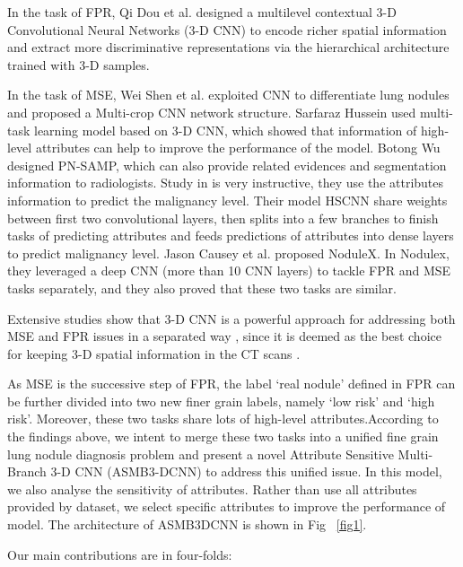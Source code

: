 \documentclass[runningheads]{llncs}
\begin{document}
In the task of FPR, Qi Dou et al. \cite{Qi2016Multilevel} designed a multilevel contextual 3-D Convolutional Neural Networks (3-D CNN) to encode richer spatial information and extract more discriminative representations via the hierarchical architecture trained with 3-D samples.

In the task of MSE, Wei Shen et al. \cite{Shen2017Multi} exploited CNN to differentiate lung nodules and proposed a Multi-crop CNN network structure. Sarfaraz Hussein \cite{Hussein2017Risk} used multi-task learning model based on 3-D CNN, which showed that information of high-level attributes can help to improve the performance of the model. Botong Wu\cite{Wu2018Joint} designed PN-SAMP, which can also provide related evidences and segmentation information to radiologists.
Study in \cite{shen2019interpretable} is very instructive, they  use the attributes information to predict the malignancy level. Their model HSCNN share weights between first two convolutional layers, then splits into a few branches to finish tasks of predicting attributes and  feeds predictions of attributes into  dense layers to predict malignancy level.
Jason Causey et al.\cite{Causey2018Highly} proposed NoduleX. In Nodulex, they leveraged a deep CNN (more than 10 CNN layers) to tackle FPR and MSE tasks separately, and they also proved that these two tasks are similar.

Extensive studies show that 3-D CNN is a powerful approach for addressing both MSE and FPR issues in a separated way \cite{Qi2016Multilevel}\cite{Causey2018Highly}\cite{Shen2015Multi}\cite{Kang20173D}, since it is deemed as the best choice for keeping 3-D spatial information in the CT scans \cite{Yorozu1987Electron}.


 As MSE is the successive step of FPR, the label `real nodule' defined in FPR can be further divided into two new finer grain labels, namely `low risk' and `high risk'. Moreover, these two tasks share lots of high-level attributes.According to the findings above, we intent to merge these two tasks into a unified fine grain lung nodule diagnosis problem and present a novel Attribute Sensitive Multi-Branch 3-D CNN (ASMB3-DCNN) to address this unified issue. In this model, we also analyse the sensitivity of attributes. Rather than use all attributes provided by dataset, we select specific attributes to improve the performance of model. 
The architecture of ASMB3DCNN is shown in Fig ~\ref{fig1}.


Our main contributions are in four-folds:
\end{document}
